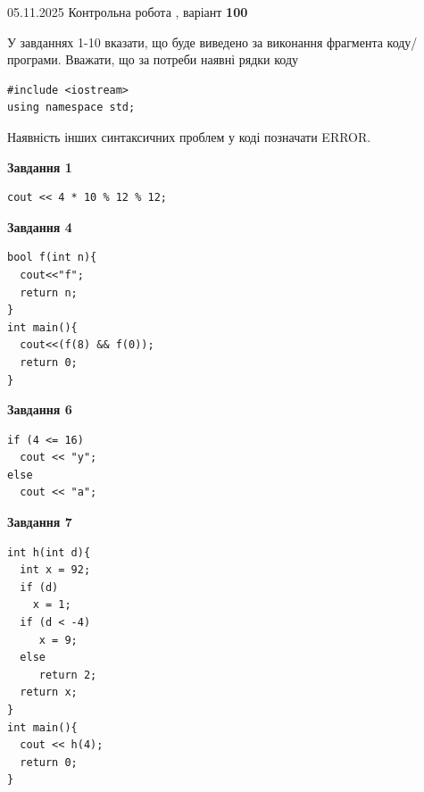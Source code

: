 \documentclass[12pt, ukrainian]{article}
\begin{document}
\newpage

{\Large{05.11.2025 Контрольна робота , варіант  \No \textbf { 100 }\par}}
{
\begin {large}
У завданнях 1-10 вказати, що буде виведено за виконання фрагмента коду/про\-гра\-ми.
Вважати, що за потреби наявні рядки коду
\begin{verbatim}
#include <iostream>
using namespace std;
\end{verbatim}
Наявність інших синтаксичних проблем у коді позначати ERROR.

\begin{minipage}[t]{7.0cm}

\begin{center}
\textbf{Завдання 1}
\end{center}
\vspace{-8mm}

\begin{verbatim}
cout << 4 * 10 % 12 % 12;
\end{verbatim}



\begin{center}
\textbf{Завдання 4}
\end{center}
\vspace{-8mm}

\begin{verbatim}
bool f(int n){
  cout<<"f";
  return n;
}
int main(){
  cout<<(f(8) && f(0));
  return 0;
}
\end{verbatim}



\begin{center}
\textbf{Завдання 6}
\end{center}
\vspace{-8mm}

\begin{verbatim}
if (4 <= 16)
  cout << "y";
else
  cout << "a";
\end{verbatim}



\begin{center}
\textbf{Завдання 7}
\end{center}
\vspace{-8mm}

\begin{verbatim}
int h(int d){
  int x = 92;
  if (d)
    x = 1;
  if (d < -4)
     x = 9;
  else
     return 2;
  return x;
}
int main(){
  cout << h(4);
  return 0;
}
\end{verbatim}


\end{minipage}
\end{large}}
\end{document}

